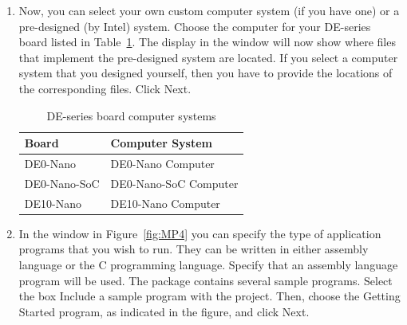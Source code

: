 \documentclass[epsfig,10pt,fullpage]{article}
\begin{document}
\begin{enumerate}
\item Now, you can select your own custom computer system (if you have one) or a 
pre-designed (by Intel) system. Choose the computer for your DE-series board listed in Table~\ref{tab:computer_systems}.  
The display in the window will now show where files that implement the pre-designed system are 
located. If you select a computer system that you designed yourself, then you have to 
provide the locations of the corresponding files. Click {\sf Next}.

\begin{table}[H]
	\begin{center}
	\begin{tabular}{ l | l }
	\bf{Board} & \bf{Computer System} \\
	\hline
	\rule{0pt}{3ex}DE0-Nano & DE0-Nano Computer \\
	DE0-Nano-SoC & DE0-Nano-SoC Computer \\
	DE10-Nano & DE10-Nano Computer \\
	\end{tabular}
	\caption{DE-series board computer systems}
	\label{tab:computer_systems}
	\end{center}
\end{table}

\item In the window in Figure~\ref{fig:MP4} you can specify the type of application 
programs that you wish to run. They can be written in either assembly language
or the C programming language.  Specify that an assembly language program will be used. 
The \productNameMed{} package contains several sample programs.
Select the box {\sf Include a sample program with the project}.
Then, choose the {\sf Getting Started} program, as indicated in the figure, and 
click {\sf Next}.


\end{enumerate}
\end{document}

